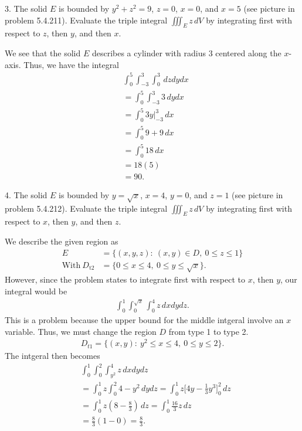 \documentclass{report}
\begin{document}
    \pagebreak \bigbreak \noindent 
    \begin{mdframed}
        3. The solid \(E\) is bounded by \(y^2 + z^2 = 9\), \(z = 0\), $x=0$, and \(x = 5\) (see picture in problem 5.4.211). Evaluate the triple integral \(\iiint_E z \, dV\) by integrating first with respect to \(z\), then \(y\), and then \(x\).
    \end{mdframed}
    \bigbreak \noindent 
    We see that the solid $E$ describes a cylinder with radius $3$ centered along the $x$-axis. Thus, we have the integral
    \begin{align*}
        &\int_{0}^{5}\int_{-3}^{3}\int_{0}^{3}\, dzdydx   \\
        &=\int_{0}^{5}\int_{-3}^{3}3\, dydx \\
        &=\int_{0}^{5} 3y\bigg|_{-3}^{3} \, dx \\
        &=\int_{0}^{5}9+9  \, dx \\
        &=\int_{0}^{5}18  \, dx \\
        &=18(5) \\
        &=90
    .\end{align*}

    \bigbreak \noindent 
    \begin{mdframed}
        4.  The solid \(E\) is bounded by \(y = \sqrt{x}\), \(x = 4\), \(y = 0\), and \(z = 1\) (see picture in problem 5.4.212). Evaluate the triple integral \(\iiint_E z \, dV\) by integrating first with respect to \(x\), then \(y\), and then \(z\).
    \end{mdframed}
    \bigbreak \noindent 
    We describe the given region as
    \begin{align*}
        E &= \{(x,y,z):\ (x,y) \in D,\ 0 \leq z \leq 1\} \\
        \text{With}\ D_{\text{t2}} &= \{0 \leq x \leq 4,\ 0 \leq y \leq \sqrt{x}\}
    .\end{align*}
    \bigbreak \noindent 
    However, since the problem states to integrate first with respect to $x$, then $y$, our integral would be
    \begin{align*}
        \int_{0}^{1}\int_{0}^{\sqrt{x}}\int_{0}^{4} z \, dxdydz
    .\end{align*}
    This is a problem because the upper bound for the middle intgeral involve an $x$ variable. Thus, we must change the region $D$ from type 1 to type 2.
    \begin{align*}
        D_{t1} = \{(x,y):\ y^{2} \leq x \leq 4,\ 0 \leq y \leq 2\}
    .\end{align*}
    The intgeral then becomes
    \begin{align*}
        &\int_{0}^{1}\int_{0}^{2}\int_{y^{2}}^{4}  z\, dxdydz \\
        &=\int_{0}^{1}z\int_{0}^{2} 4- y^{2}\, dydz =\int_{0}^{1} z \bigg[4y-\frac{1}{3}y^{3}\bigg]_{0}^{2}\, dz \\
        &=\int_{0}^{1} z\left(8-\frac{8}{3}\right) \, dz  = \int_{0}^{1} \frac{16}{3}z \, dz\\ 
        &= \frac{8}{3}(1-0) = \frac{8}{3}
    .\end{align*}
\end{document}
